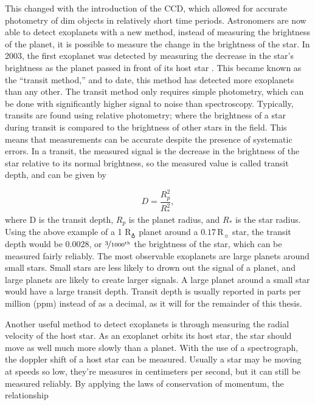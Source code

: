 This changed with the introduction of the CCD, which allowed for accurate
 photometry of dim objects in relatively short time periods.
 Astronomers are now able to detect exoplanets with a new method, instead of
 measuring the brightness of the planet, it is possible to measure the change in the
 brightness of the star. In 2003, the first exoplanet was detected by measuring
 the decrease in the star's brightness as the planet passed in front of its host
 star \citep{firsttransit}. This became known as the ``transit method,'' and to
 date, this method has detected more exoplanets than any other. The transit
 method only requires simple photometry, which can be done with significantly
 higher signal to noise than spectroscopy. Typically, transits are found using
 relative photometry; where the brightness of a star during transit is
 compared to the brightness of other stars in the field. This means that
 measurements can be accurate despite the presence of systematic errors. In a
 transit, the measured signal is the decrease in the brightness of the star
 relative to its normal brightness, so the measured value is called transit
 depth, and can be given by

\begin{equation}
    D=\frac{R_p^2}{R_*^2},
\end{equation}
where D is the transit depth, $R_p$ is the planet radius, and $R_*$ is the star
 radius. Using the above example of a 1 $\mathrm{R}_\earth$ planet around a
 $0.17\, \mathrm{R}_\sun$ star, the transit depth would be 0.0028, or
 $\nicefrac{3}{1000^\mathrm{th}}$ the brightness of the star, which can be
 measured fairly reliably. The most observable exoplanets are large planets
 around small stars. Small stars are less likely to drown out the signal of a
 planet, and large planets are likely to create larger signals. A large planet
 around a small star would have a large transit depth. Transit depth is usually
 reported in parts per million (ppm) instead of as a
 decimal, as it will for the remainder of this thesis.

Another useful method to detect exoplanets is through measuring the radial
 velocity of the host star. As an
 exoplanet orbits its host star, the star should move as well much more slowly
 than a planet. With the use of a spectrograph, the doppler shift of a host star
 can be measured. Usually a star may be moving at speeds so low, they're
 measures in centimeters per second, but it can still be measured reliably. By
 applying the laws of conservation of momentum, the relationship

